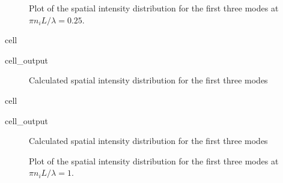 \documentclass[a4paper,10pt,english,openany,oneside]{jupyterBook}
\begin{document}
\begin{figure}[htbp]
\centering
\capstart

\noindent{}
\caption{Plot of the spatial intensity distribution for the first three modes at \(\pi n_i L/\lambda=0.25\).}\label{\detokenize{Kogelnik-Shank_Coupled-Wave-Theory_DFB-Lasers:kogelnik11a}}\end{figure}

\begin{sphinxuseclass}{cell}\begin{sphinxVerbatimOutput}

\begin{sphinxuseclass}{cell_output}
\begin{figure}[htbp]
\centering
\capstart

\noindent{}
\caption{Calculated spatial intensity distribution for the first three modes}\label{\detokenize{Kogelnik-Shank_Coupled-Wave-Theory_DFB-Lasers:kogelnik11ac}}\end{figure}

\end{sphinxuseclass}\end{sphinxVerbatimOutput}

\end{sphinxuseclass}
\begin{sphinxuseclass}{cell}\begin{sphinxVerbatimOutput}

\begin{sphinxuseclass}{cell_output}
\begin{figure}[htbp]
\centering
\capstart

\noindent{}
\caption{Calculated spatial intensity distribution for the first three modes}\label{\detokenize{Kogelnik-Shank_Coupled-Wave-Theory_DFB-Lasers:kogelnik11bc}}\end{figure}

\end{sphinxuseclass}\end{sphinxVerbatimOutput}

\end{sphinxuseclass}
\begin{figure}[htbp]
\centering
\capstart

\noindent{}
\caption{Plot of the spatial intensity distribution for the first three modes at \(\pi n_i L/\lambda=1\).}\label{\detokenize{Kogelnik-Shank_Coupled-Wave-Theory_DFB-Lasers:kogelnik11b}}\end{figure}
\end{document}

